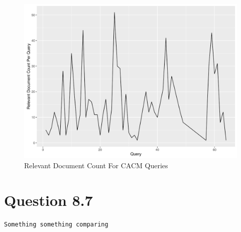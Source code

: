 \documentclass[11pt]{article}
\newenvironment{code}{\captionsetup{type=listing}}{}
\begin{document}
\begin{figure}[H]
\centering
\includegraphics[scale=0.9]{q2_plot_rc.png}
\caption{Relevant Document Count For CACM Queries}
\label{fig:q2plot3}
\end{figure}
\begin{code}
\label{code:q2py}
\end{code}
\begin{code}
\label{code:q2r}
\end{code}
\newpage
\section{Question 8.7} \label{q3}
\begin{verbatim}
Something something comparing
\end{verbatim}
\end{document}
